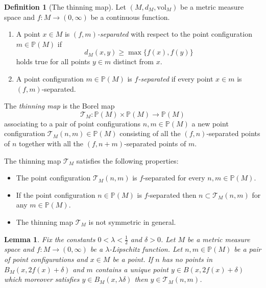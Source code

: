 \documentclass{amsart}
\newcommand{\Points}{\mathbb{P}}
\theoremstyle{plain}
\newtheorem{lemma}[theorem]{Lemma}
\numberwithin{equation}{section}
\theoremstyle{definition}
\newtheorem{definition}[theorem]{Definition}
\begin{document}
\begin{definition}[The thinning map]
\label{def:thinningMap}
Let $(M,d_M,\mathrm{vol}_M)$ be a metric measure space and $f : M \to (0,\infty)$ be a continuous function. \begin{enumerate}
    \item A point $x \in M$ is \emph{$(f,m)$-separated} with respect to the point configuration $m \in \Points(M)$ if 
$$d_M(x,y) \ge \max\{ f(x), f(y)\}$$ holds true for all points $y \in m $ distinct from $x$.
\item A point configuration $m \in \Points(M)$ is \emph{$f$-separated} if every point $x \in m$ is $(f,m)$-separated.
\end{enumerate} 
The \emph{thinning map} is the Borel map
$$ \mathcal{T}_M : \Points(M) \times \Points(M) \to \Points(M) $$
associating to a pair of point configurations $n,m \in \Points(M) $ a new point configuration $\mathcal{T}_M(n,m) \in \Points(M)$ consisting of all the $(f,n)$-separated points of $n$ together with all the $(f,n+m)$-separated points of $m$.
\end{definition}

The thinning map $\mathcal{T}_M$  satisfies the following properties:
\begin{itemize}
    \item The point configuration $\mathcal{T}_M(n,m)$ is $f$-separated for every $n,m \in \Points(M)$.
    \item If the point configuration $n \in \Points(M)$ is $f$-separated then $n \subset \mathcal{T}_M(n,m)$ for any $m \in \Points(M)$.
    \item The thinning map $\mathcal{T}_M$ is not symmetric in general.
\end{itemize}





\begin{lemma}
\label{lemma:1-Lipshitz is slowly varying}
Fix the constants $0 < \lambda < \frac{1}{2}$ and $\delta > 0$. Let $M$ be a metric measure space and $f : M \to (0,\infty)$ be a $\lambda$-Lipschitz function. 
Let   $n,m \in \Points(M) $ be a pair of point configurations and $x \in M$ be a point. If $n$ has no points in $B_M(x,2f(x) +\delta)$ and $m$ contains a \emph{unique} point $y \in B(x,2 f(x)+\delta)$ which moreover satisfies $y \in B_M(x,\lambda \delta)$ then $y\in \mathcal{T}_M(n,m)$.  
\end{lemma}
\end{document}
